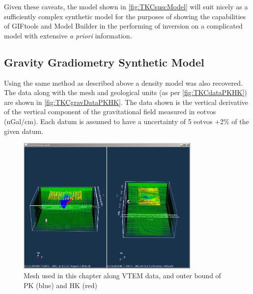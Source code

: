 Given these caveats, the model shown in \autoref{fig:TKCsuscModel} will suit nicely as a sufficiently complex synthetic model for the purposes of showing the capabilities of GIFtools and Model Builder in the performing of inversion on a complicated model with extensive \emph{a priori} information.
%
%
%

\subsection{Gravity Gradiometry Synthetic Model }
\label{subsec:Synthetic Model:GG:TKC}

Using the same method as described above a density model was also recovered. The data along with the mesh and geological units (as per \autoref{fig:TKCdataPKHK}) are shown in \autoref{fig:TKCgravDataPKHK}. The data shown is the vertical derivative of the vertical component of the gravitational field measured in  eotvos (nGal/cm). Each datum is assumed to have a uncertainty of 5 eotvos +2\% of the given datum.

\begin{figure} [h]
   \centering
   \includegraphics[width=0.8\textwidth]{images/TKC/TKCgravDataPKHK.PNG}
   \caption{Mesh used in this chapter along VTEM data, and outer bound of PK (blue) and HK (red)}
   \label{fig:TKCgravDataPKHK}
\end{figure}

